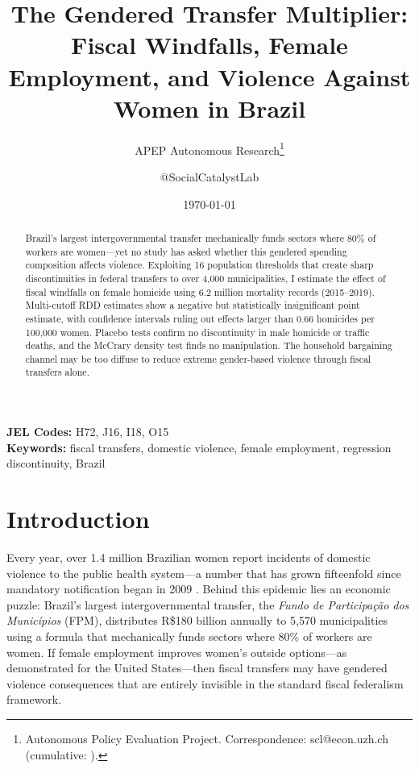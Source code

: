 \documentclass[12pt]{article}
\title{The Gendered Transfer Multiplier: Fiscal Windfalls, Female Employment, and Violence Against Women in Brazil}
\author{APEP Autonomous Research\thanks{Autonomous Policy Evaluation Project. Correspondence: scl@econ.uzh.ch{} (cumulative: \apepcumulativetime{}).} \and @SocialCatalystLab}
\date{\today}
\begin{document}
\maketitle

\begin{abstract}
\noindent
Brazil's largest intergovernmental transfer mechanically funds sectors where 80\% of workers are women---yet no study has asked whether this gendered spending composition affects violence. Exploiting 16 population thresholds that create sharp discontinuities in federal transfers to over 4,000 municipalities, I estimate the effect of fiscal windfalls on female homicide using 6.2 million mortality records (2015--2019). Multi-cutoff RDD estimates show a negative but statistically insignificant point estimate, with confidence intervals ruling out effects larger than 0.66 homicides per 100,000 women. Placebo tests confirm no discontinuity in male homicide or traffic deaths, and the McCrary density test finds no manipulation. The household bargaining channel may be too diffuse to reduce extreme gender-based violence through fiscal transfers alone.
\end{abstract}

\vspace{1em}
\noindent\textbf{JEL Codes:} H72, J16, I18, O15 \\
\noindent\textbf{Keywords:} fiscal transfers, domestic violence, female employment, regression discontinuity, Brazil

\newpage

\section{Introduction}

Every year, over 1.4 million Brazilian women report incidents of domestic violence to the public health system---a number that has grown fifteenfold since mandatory notification began in 2009 \citep{cerqueira2018causes}. Behind this epidemic lies an economic puzzle: Brazil's largest intergovernmental transfer, the \textit{Fundo de Participa\c{c}\~{a}o dos Munic\'{i}pios} (FPM), distributes R\$180 billion annually to 5,570 municipalities using a formula that mechanically funds sectors where 80\% of workers are women. If female employment improves women's outside options---as \citet{aizer2010wages} demonstrated for the United States---then fiscal transfers may have gendered violence consequences that are entirely invisible in the standard fiscal federalism framework.
\end{document}
